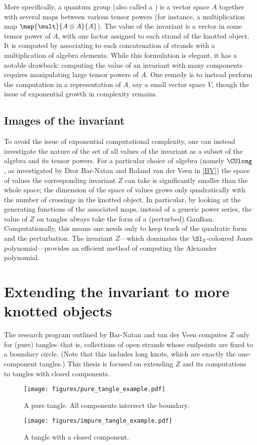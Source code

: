 More specifically, a quantum group (also called a ) is a
vector space $A$ together with several maps between various tensor powers (for
instance, a multiplication map $\map {\mult} {A \otimes A} {A}$). The value of
the invariant is a vector in some tensor power of $A$, with one factor assigned
to each strand of the knotted object. It is computed by associating to each
concatenation of strands with a multiplication of algebra elements. While this
formulation is elegant, it has a notable drawback: computing the value of an
invariant with many components requires manipulating large tensor powers of $A$.
One remedy is to instead perform the computation in a representation of $A$, say
a small vector space $V$, though the issue of exponential growth in complexity
remains.

\subsection{Images of the invariant}
To avoid the issue of exponential computational complexity, one can instead
investigate the nature of the set of all values of the invariant as a subset of
the algebra and its tensor powers. For a particular choice of algebra (namely
$\CUlong$, as investigated by Dror Bar-Natan and Roland van der Veen in
\cref{BV}) the space of values the corresponding invariant $Z$ can take is
significantly smaller than the whole space; the dimension of the space of values
grows only quadratically with the number of crossings in the knotted object. In
particular, by looking at the generating functions of the associated maps,
instead of a generic power series, the value of $Z$ on tangles always take the
form of a (perturbed) Gaußian. Computationally, this means one needs only to
keep track of the quadratic form and the perturbation. The invariant $Z$---which
dominates the $\Sl_2$-coloured Jones polynomial---provides an efficient method
of computing the Alexander polynomial.

\section{Extending the invariant to more knotted objects}
The research program outlined by Bar-Natan and van der Veen computes $Z$
only for (pure) tangles--that is, collections of open strands whose endpoints
are fixed to a boundary circle. (Note that this includes long knots, which are
exactly the one-component tangles.) This thesis is focused on extending $Z$ and
its computations to tangles with closed components.
\begin{figure}[h]
        \centering
        \texttt{[image: figures/pure\_tangle\_example.pdf]}
        \caption{A pure tangle. All components intersect the boundary.}
        \label{fig:pure_tangle}
\end{figure}
\begin{figure}[h]
        \centering
        \texttt{[image: figures/impure\_tangle\_example.pdf]}
        \caption{A tangle with a closed component.}
        \label{fig:impure_tangle}
\end{figure}        

